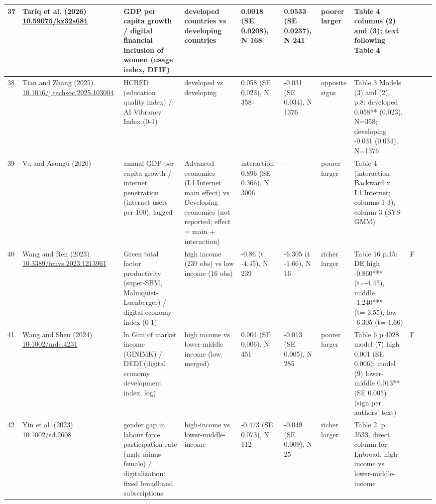 \documentclass[10pt,a4paper]{article}
\begin{document}
\begin{longtable}{@{}p{0.4cm}p{2.4cm}p{2.6cm}p{3.0cm}p{2.6cm}p{2.6cm}p{1.5cm}p{5.6cm}p{0.3cm}p{1.0cm}p{1.6cm}@{}}
37 & Tariq et al. (2026) \newline \url{10.59075/kz32s681} & GDP per capita growth / digital financial inclusion of women (usage index, DFIF) & developed countries vs developing countries & 0.0018 (SE 0.0208), N 168 & 0.0533 (SE 0.0237), N 241 & poorer larger & Table 4 columns (2) and (3); text following Table 4 &  &  &  \\ \midrule
38 & Tian and Zhang (2025) \newline \url{10.1016/j.techsoc.2025.103004} & HCBED (education quality index) / AI Vibrancy Index (0-1) & developed vs developing & 0.058 (SE 0.023), N 358 & -0.031 (SE 0.034), N 1376 & opposite signs & Table 3 Models (3) and (2), p.8: developed 0.058** (0.023), N=358; developing -0.031 (0.034), N=1376 &  &  &  \\ \midrule
39 & Vu and Asongu (2020) & annual GDP per capita growth / internet penetration (internet users per 100), lagged & Advanced economies (L1.Internet main effect) vs Developing economies (not reported; effect = main + interaction) & interaction 0.896 (SE 0.366), N 3006 & -- & poorer larger & Table 4 (interaction Backward x L1.Internet; columns 1-3), column 3 (SYS-GMM) &  &  &  \\ \midrule
40 & Wang and Ren (2023) \newline \url{10.3389/fenvs.2023.1213961} & Green total factor productivity (super-SBM, Malmquist-Luenberger) / digital economy index (0-1) & high income (239 obs) vs low income (16 obs) & -0.86 (t -4.45), N 239 & -6.305 (t -1.66), N 16 & richer larger & Table 16 p.15: DE high -0.860*** (t=-4.45), middle -1.240*** (t=-3.55), low -6.305 (t=-1.66) & F &  &  \\ \midrule
41 & Wang and Shen (2024) \newline \url{10.1002/mde.4231} & ln Gini of market income (GINIMK) / DEDI (digital economy development index, log) & high income vs lower-middle income (low merged) & 0.001 (SE 0.006), N 451 & -0.013 (SE 0.005), N 285 & poorer larger & Table 6 p.4028 model (7) high 0.001 (SE 0.006); model (9) lower-middle 0.013** (SE 0.005) (sign per authors' text) & F &  &  \\ \midrule
42 & Yin et al. (2023) \newline \url{10.1002/sd.2608} & gender gap in labour force participation rate (male minus female) / digitalization: fixed broadband subscriptions & high-income vs lower-middle-income & -0.473 (SE 0.073), N 112 & -0.049 (SE 0.009), N 25 & richer larger & Table 2, p. 3533, direct column for Lnbroad: high-income vs lower-middle-income &  &  &  \\ \midrule

\end{longtable}
\end{document}
